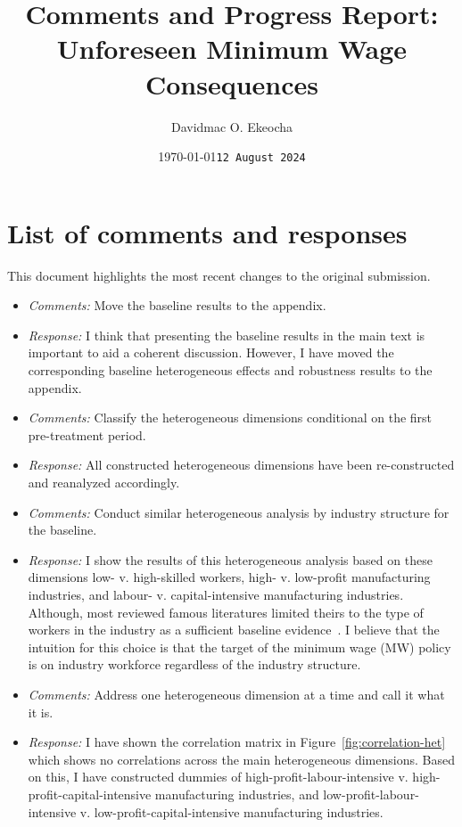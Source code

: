 \documentclass[12pt, english]{article}
\title{{Comments and Progress Report: Unforeseen Minimum Wage Consequences}}
\author[1]{Davidmac O. Ekeocha}
\affil[1]{
    University of Liverpool Management School \\
    \texttt{davidmac.ekeocha@liverpool.ac.uk}
}
\date{\today}
\begin{document}
    \maketitle
    \section*{List of comments and responses}
    This document highlights the most recent changes to the original submission.

    \date{\texttt{12 August 2024}}
    \begin{itemize}
        \item \textit{Comments:} Move the baseline results to the appendix.
        \item \textit{Response:} I think that presenting the baseline results in the main text is important to aid a coherent discussion. However, I have moved the corresponding baseline heterogeneous effects and robustness results to the appendix.
        \item \textit{Comments:} Classify the heterogeneous dimensions conditional on the first pre-treatment period.
        \item \textit{Response:} All constructed heterogeneous dimensions have been re-constructed and reanalyzed accordingly.
        \item \textit{Comments:} Conduct similar heterogeneous analysis by industry structure for the baseline.
        \item \textit{Response:} I show the results of this heterogeneous analysis based on these dimensions low- v. high-skilled workers, high- v. low-profit manufacturing industries, and labour- v. capital-intensive manufacturing industries. Although, most reviewed famous literatures limited theirs to the type of workers in the industry as a sufficient baseline evidence~\parencite{cengiz2019effect, gopalan2021state, clemens2019making, dube2010minimum, dustmann2022reallocation}. I believe that the intuition for this choice is that the target of the minimum wage (MW) policy is on industry workforce regardless of the industry structure.
        \item \textit{Comments:} Address one heterogeneous dimension at a time and call it what it is.
        \item \textit{Response:} I have shown the correlation matrix in Figure~\ref{fig:correlation-het} which shows no correlations across the main heterogeneous dimensions. Based on this, I have constructed dummies of high-profit-labour-intensive v. high-profit-capital-intensive manufacturing industries, and low-profit-labour-intensive v. low-profit-capital-intensive manufacturing industries. 
    \end{itemize}
    \newpage
    \printbibliography
\end{document}
